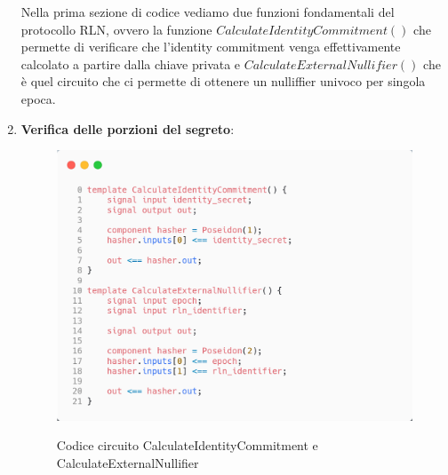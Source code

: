 \begin{enumerate}
    Nella prima sezione di codice vediamo due funzioni fondamentali del protocollo RLN, ovvero la funzione
    $CalculateIdentityCommitment()$ che permette di verificare che l'identity commitment venga effettivamente calcolato
    a partire dalla chiave privata e $CalculateExternalNullifier()$ che è quel circuito che ci permette di ottenere un
    nulliffier univoco per singola epoca.\clearpage
    \item \textbf{Verifica delle porzioni del segreto}:
    \begin{figure}[H]
        \centering
        \includegraphics[width=11cm]{./chapters/3.poc/images/2.1.verify_shares.png}
        \label{fig:1.verify_shares}
        \captionsetup{justification=centering}
        \caption{Codice circuito CalculateIdentityCommitment e CalculateExternalNullifier}
    \end{figure}
    

\end{enumerate}
